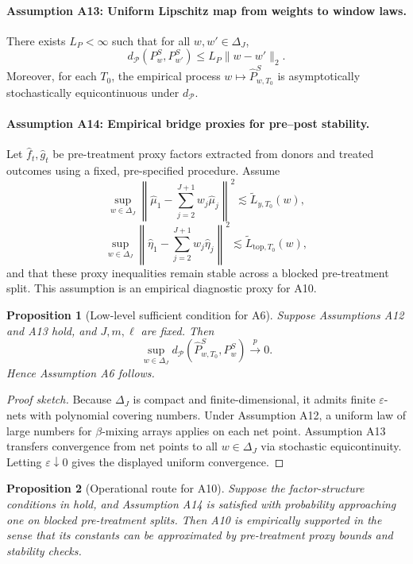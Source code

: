\documentclass[11pt]{article}
\theoremstyle{plain}
\newtheorem{proposition}[proposition]{Proposition}
\theoremstyle{definition}
\theoremstyle{remark}
\newcommand{\1}{\mathbbm{1}}
\newcommand{\pto}{\xrightarrow{p}}
\begin{document}
\paragraph{Assumption A13: Uniform Lipschitz map from weights to window laws.}
There exists \(L_P<\infty\) such that for all \(w,w'\in\Delta_J\),
\[
d_{\mathcal P}(P_w^{S},P_{w'}^{S})
\le
L_P\|w-w'\|_2.
\]
Moreover, for each \(T_0\), the empirical process
\(w\mapsto \widehat P_{w,T_0}^{S}\) is asymptotically stochastically
equicontinuous under \(d_{\mathcal P}\).

\paragraph{Assumption A14: Empirical bridge proxies for pre--post stability.}
Let \(\widehat f_t,\widehat g_t\) be pre-treatment proxy factors extracted from
donors and treated outcomes using a fixed, pre-specified procedure. Assume
\[
\sup_{w\in\Delta_J}
\left\|
\widehat\mu_1-\sum_{j=2}^{J+1}w_j\widehat\mu_j
\right\|^2
\lesssim
\widetilde L_{y,T_0}(w),
\]
\[
\sup_{w\in\Delta_J}
\left\|
\widehat\eta_1-\sum_{j=2}^{J+1}w_j\widehat\eta_j
\right\|^2
\lesssim
\widetilde L_{\mathrm{top},T_0}(w),
\]
and that these proxy inequalities remain stable across a blocked
pre-treatment split. This assumption is an empirical diagnostic proxy for A10.

\begin{proposition}[Low-level sufficient condition for A6]
\label{prop:lowlevel-a6}
Suppose Assumptions A12 and A13 hold, and \(J,m,\ell\) are fixed. Then
\[
\sup_{w\in\Delta_J}
d_{\mathcal P}
\left(
\widehat P_{w,T_0}^{S},
P_w^{S}
\right)
\pto0.
\]
Hence Assumption A6 follows.
\end{proposition}

\begin{proof}[Proof sketch]
Because \(\Delta_J\) is compact and finite-dimensional, it admits finite
\(\varepsilon\)-nets with polynomial covering numbers. Under Assumption A12, a
uniform law of large numbers for \(\beta\)-mixing arrays applies on each net
point. Assumption A13 transfers convergence from net points to all
\(w\in\Delta_J\) via stochastic equicontinuity. Letting \(\varepsilon\downarrow0\)
gives the displayed uniform convergence.
\end{proof}

\begin{proposition}[Operational route for A10]
\label{prop:operational-a10}
Suppose the factor-structure conditions in
 hold, and Assumption A14 is satisfied with
probability approaching one on blocked pre-treatment splits. Then A10 is
empirically supported in the sense that its constants can be approximated by
pre-treatment proxy bounds and stability checks.
\end{proposition}
\end{document}
